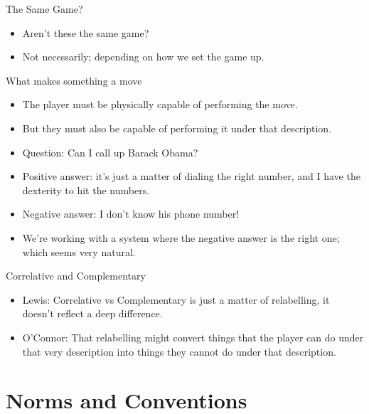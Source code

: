 \documentclass[
  ignorenonframetext,
]{beamer}
\providecommand{\tightlist}{%
  \setlength{\itemsep}{0pt}\setlength{\parskip}{0pt}}
\begin{document}
\begin{frame}{The Same Game?}
\protect\hypertarget{the-same-game}{}
\begin{itemize}
\tightlist
\item
  Aren't these the same game? \pause
\item
  Not necessarily; depending on how we set the game up.
\end{itemize}
\end{frame}

\begin{frame}{What makes something a move}
\protect\hypertarget{what-makes-something-a-move}{}
\begin{itemize}
\tightlist
\item
  The player must be physically capable of performing the move.
\item
  But they must also be capable of performing it under that description.
  \pause
\item
  Question: Can I call up Barack Obama? \pause
\item
  Positive answer: it's just a matter of dialing the right number, and I
  have the dexterity to hit the numbers. \pause
\item
  Negative answer: I don't know his phone number!
\item
  We're working with a system where the negative answer is the right
  one; which seems very natural.
\end{itemize}
\end{frame}

\begin{frame}{Correlative and Complementary}
\protect\hypertarget{correlative-and-complementary}{}
\begin{itemize}
\tightlist
\item
  Lewis: Correlative vs Complementary is just a matter of relabelling,
  it doesn't reflect a deep difference.
\item
  O'Connor: That relabelling might convert things that the player can do
  under that very description into things they cannot do under that
  description.
\end{itemize}
\end{frame}

\hypertarget{norms-and-conventions}{%
\section{Norms and Conventions}\label{norms-and-conventions}}
\end{document}
